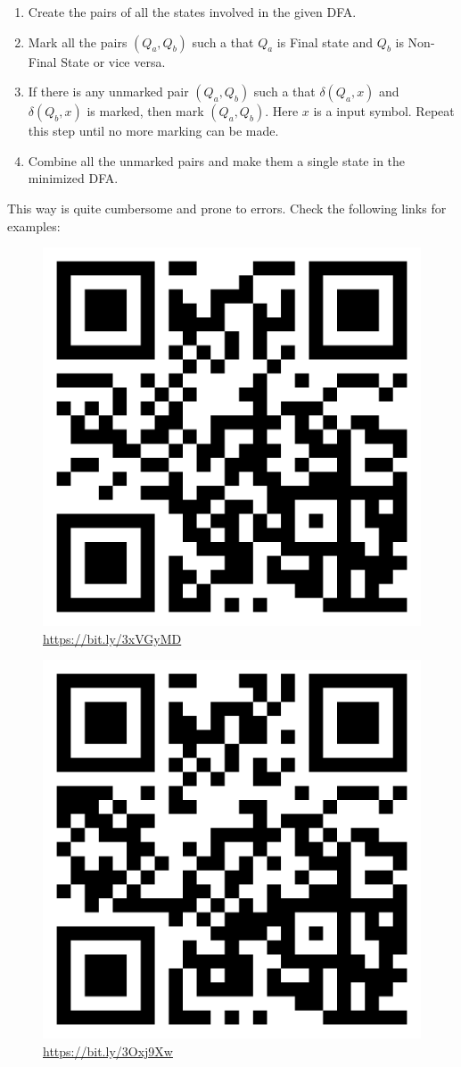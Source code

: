 \begin{multicols}{2}
\setlength{\columnsep}{1.5cm}
\setlength{\columnseprule}{0.2pt}

\begin{enumerate}
  \item Create the pairs of all the states involved in the given DFA.
  \item Mark all the pairs $(Q_a, Q_b)$ such a that $Q_a$ is Final state and $Q_b$ is Non-Final State or vice versa.
  \item If there is any unmarked pair $(Q_a, Q_b)$ such a that $\delta(Q_a, x)$ and $\delta(Q_b, x)$ is marked, then mark $(Q_a, Q_b)$. Here $x$ is a input symbol. Repeat this step until no more marking can be made.
  \item Combine all the unmarked pairs and make them a single state in the minimized DFA.
\end{enumerate}

\vfill\null
\columnbreak

This way is quite cumbersome and prone to errors. Check the following links for examples:

\begin{figure}[H]
  \centering
  \includegraphics[width=.2\textwidth]{img/minizimation-1.png}
  \caption{\href{https://bit.ly/3xVGyMD}{https://bit.ly/3xVGyMD}}
\end{figure}

\begin{figure}[H]
  \centering
  \includegraphics[width=.2\textwidth]{img/minizimation-2.png}
  \caption{\href{https://bit.ly/3Oxj9Xw}{https://bit.ly/3Oxj9Xw}}
\end{figure}

\end{multicols}
